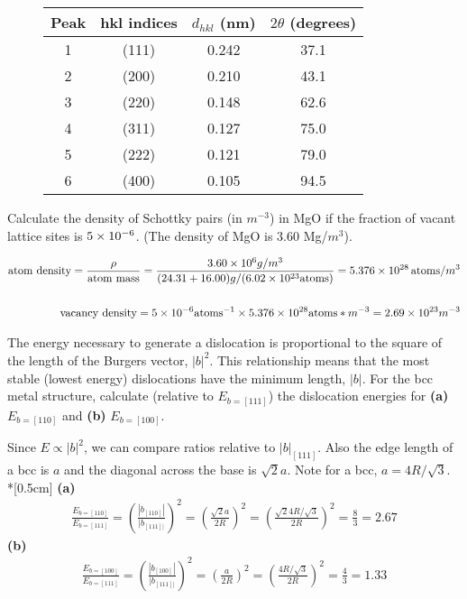 \documentclass[12pt]{article}
\newenvironment{problem}[2][Problem]{\begin{trivlist}
\item[\hskip \labelsep {\bfseries #1}\hskip \labelsep {\bfseries #2.}]}{\end{trivlist}}
\begin{document}
\begin{figure}[H]
\centering
\begin{tabular}{c | c | c | c}
Peak & hkl indices & $d_{hkl}$ (nm) & $2\theta$ (degrees) \\ \hline
1 & (111) & 0.242 & 37.1 \\ \hline
2 & (200) & 0.210 & 43.1 \\ \hline
3 & (220) & 0.148 & 62.6 \\ \hline
4 & (311) & 0.127 & 75.0 \\ \hline
5 & (222) & 0.121 & 79.0 \\ \hline
6 & (400) & 0.105 & 94.5 \\ 
\end{tabular}
\end{figure}

\begin{problem}{4.19}
Calculate the density of Schottky pairs (in $m^{-3}$) in MgO if the fraction of vacant lattice sites is $5\times 10^{-6}$.  (The density of MgO is 3.60 Mg/$m^3$).
\end{problem}

\begin{align*}
\text{atom density} = \frac{\rho}{\text{atom mass}} = \frac{3.60 \times 10^{6} g/m^3}{(24.31 + 16.00)g/(6.02\times 10^{23}\text{atoms})} = 5.376 \times 10^{28}\,\text{atoms}/m^3 \\ \\
\text{vacancy density} = 5\times 10^{-6} \text{atoms}^{-1} \times 5.376\times 10^{28} \text{atoms}*m^{-3} = 2.69 \times 10^{23} m^{-3}
\end{align*}

\begin{problem}{4.21}
The energy necessary to generate a dislocation is proportional to the square of the length of the Burgers vector, $|b|^2$.  This relationship means that the most stable (lowest energy) dislocations have the minimum length, $|b|$.  For the bcc metal structure, calculate (relative to $E_{b=[111]}$) the dislocation energies for \textbf{(a)} $E_{b=[110]}$ and \textbf{(b)} $E_{b=[100]}$.
\end{problem}

Since $E \propto |b|^2$, we can compare ratios relative to $|b|_{[111]}$.  Also the edge length of a bcc is $a$ and the diagonal across the base is $\sqrt{2}a$. Note for a bcc, $a = 4R/\sqrt{3}$.\\*[0.5cm]
\textbf{(a)}
\begin{align*}
\frac{E_{b=[110]}}{E_{b=[111]}} = (\frac{|b_{[110]}|}{|b_{[111]|}})^2 = (\frac{\sqrt{2}a}{2R})^2 = (\frac{\sqrt{2}4R/\sqrt{3}}{2R})^2 = \frac{8}{3} = 2.67
\end{align*}
\textbf{(b)}
\begin{align*}
\frac{E_{b=[100]}}{E_{b=[111]}} = (\frac{|b_{[100]}|}{|b_{[111]|}})^2 = (\frac{a}{2R})^2 = (\frac{4R/\sqrt{3}}{2R})^2 = \frac{4}{3} = 1.33
\end{align*}
\end{document}
